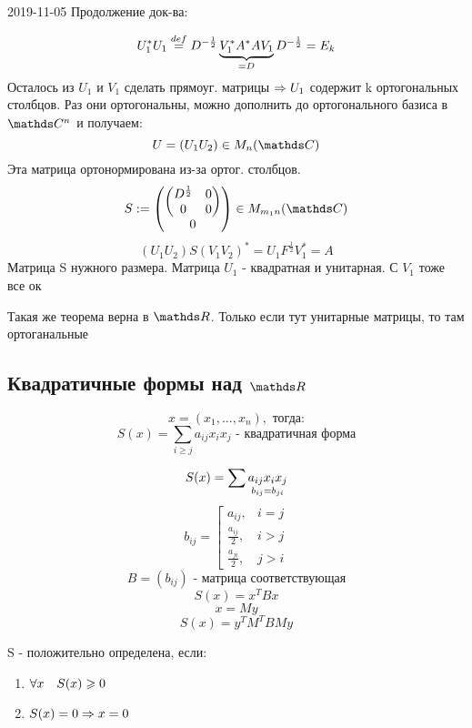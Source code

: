 \documentclass[main]{subfiles}
\begin{document}
  \begin{lect}{2019-11-05}
    Продолжение док-ва:
    \begin{Proof}
      \[U_1^* U_1 \os{def}{=} D^{-\frac{1}{2}} \ub{=D}{V_1^* A^* A V_1} D^{-\frac{1}{2}} = E_k\]
      Осталось из $U_1$ и $V_1$ сделать прямоуг. матрицы $\Ra U_1$ содержит k ортогональных столбцов. Раз они ортогональны, можно дополнить до ортогонального базиса в $\CC^n$ и получаем:
      \[U=(U_1 U_2) \in M_n(\CC)\]
      Эта матрица ортонормирована из-за ортог. столбцов.
      \[S:=\begin{pmatrix}
      \begin{pmatrix}
        D^{\frac{1}{2}} & 0\\
        0 & 0
      \end{pmatrix}\\
      0
      \end{pmatrix} \in M_{m_1 n}(\CC)\]
      \[(U_1 U_2) S (V_1 V_2)^* = U_1 F^{\frac{1}{2}} V_1^* = A\]
      Матрица S нужного размера. Матрица $U_1$ - квадратная и унитарная. С $V_1$ тоже все ок
    \end{Proof}

    \begin{remark}
      Такая же теорема верна в $\R$. Только если тут унитарные матрицы, то там ортоганальные
    \end{remark}

    \subsection{Квадратичные формы над $\R$}
    \begin{Definition}
      \[x=(x_1,...,x_n),\text{ тогда:}\]
      \[S(x) = \sum_{i \geq j} a_{ij} x_i x_j \text{ - квадратичная форма}\]
    \end{Definition}

    \begin{Remark}
      \[S(x) = \sum \us{b_{ij} = b_{ji}}{a_{ij} x_i x_j}\]
      \[b_{ij} = \left[\begin{matrix}
        a_{ij}, & i=j\\
        \frac{a_{ij}}{2}, & i > j\\
        \frac{a_{ji}}{2}, & j>i
      \end{matrix}\right.\]
      \[B=(b_{ij}) \text{ - матрица соответствующая}\]
      \[S(x) = x^T B x\]
      \[x = My\]
      \[S(x) = y^T M^T B My\]
    \end{Remark}

    \begin{definition}
      S - положительно определена, если:
      \begin{enumerate}
        \item $\forall x \q S(x) \geq 0$
        \item $S(x) = 0 \Ra x = 0$
      \end{enumerate}
    \end{definition}


\end{lect}
\end{document}
